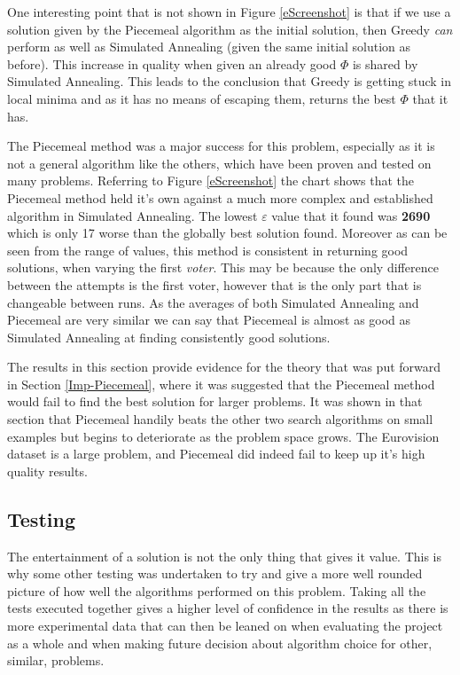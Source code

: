\documentclass[12pt]{report}
\begin{document}
One interesting point that is not shown in Figure \ref{eScreenshot} is that if we use a solution given by the Piecemeal algorithm as the initial solution, then Greedy \textit{can} perform as well as Simulated Annealing (given the same initial solution as before). This increase in quality when given an already good $\Phi$ is shared by Simulated Annealing. This leads to the conclusion that Greedy is getting stuck in local minima and as it has no means of escaping them, returns the best $\Phi$ that it has.

The Piecemeal method was a major success for this problem, especially as it is not a general algorithm like the others, which have been proven and tested on many problems. Referring to Figure \ref{eScreenshot} the chart shows that the Piecemeal method held it's own against a much more complex and established algorithm in Simulated Annealing. The lowest $\varepsilon$ value that it found was \textbf{2690} which is only 17 worse than the globally best solution found. Moreover as can be seen from the range of values, this method is consistent in returning good solutions, when varying the first \textit{voter}. This may be because the only difference between the attempts is the first voter, however that is the only part that is changeable between runs. As the averages of both Simulated Annealing and Piecemeal are very similar we can say that Piecemeal is almost as good as Simulated Annealing at finding consistently good solutions.

The results in this section provide evidence for the theory that was put forward in Section \ref{Imp-Piecemeal}, where it was suggested that the Piecemeal method would fail to find the best solution for larger problems. It was shown in that section that Piecemeal handily beats the other two search algorithms on small examples but begins to deteriorate as the problem space grows. The Eurovision dataset is a large problem, and Piecemeal did indeed fail to keep up it's high quality results.

\subsection{Testing}\label{OtherTesting}
The entertainment of a solution is not the only thing that gives it value. This is why some other testing was undertaken to try and give a more well rounded picture of how well the algorithms performed on this problem. Taking all the tests executed together gives a higher level of confidence in the results as there is more experimental data that can then be leaned on when evaluating the project as a whole and when making future decision about algorithm choice for other, similar, problems.
\end{document}
